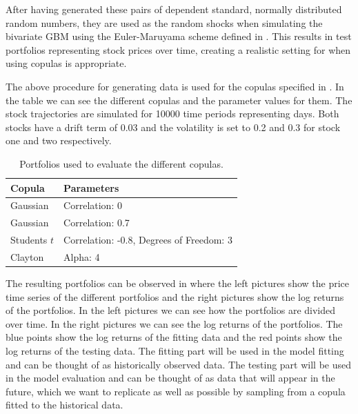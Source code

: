 After having generated these pairs of dependent standard, normally distributed random numbers, they are used as the random shocks when simulating the bivariate \gls{GBM} using the Euler-Maruyama scheme defined in . This results in test portfolios representing stock prices over time, creating a realistic setting for when using copulas is appropriate. 

The above procedure for generating data is used for the copulas specified in . In the table we can see the different copulas and the parameter values for them. The stock trajectories are simulated for 10000 time periods representing days. Both stocks have a drift term of 0.03 and the volatility is set to 0.2 and 0.3 for stock one and two respectively. 
\begin{table}[h!]
    \centering
    \caption{Portfolios used to evaluate the different copulas.}
    \begin{tabular}{ll}
    \textbf{Copula} & \textbf{Parameters} \\
    \hline
    Gaussian & Correlation: 0 \\
    Gaussian & Correlation: 0.7\\
    Students $t$ & Correlation: -0.8, Degrees of Freedom: 3\\
    Clayton & Alpha: 4 \\
    \end{tabular}
    \label{tab:DatasetsUsed}
\end{table}



The resulting portfolios can be observed in  where the left pictures show the price time series of the different portfolios and the right pictures show the log returns of the portfolios. In the left pictures we can see how the portfolios are divided over time. In the right pictures we can see the log returns of the portfolios. The blue points show the log returns of the fitting data and the red points show the log returns of the testing data. The fitting part will be used in the model fitting and can be thought of as historically observed data. The testing part will be used in the model evaluation and can be thought of as data that will appear in the future, which we want to replicate as well as possible by sampling from a copula fitted to the historical data. 

